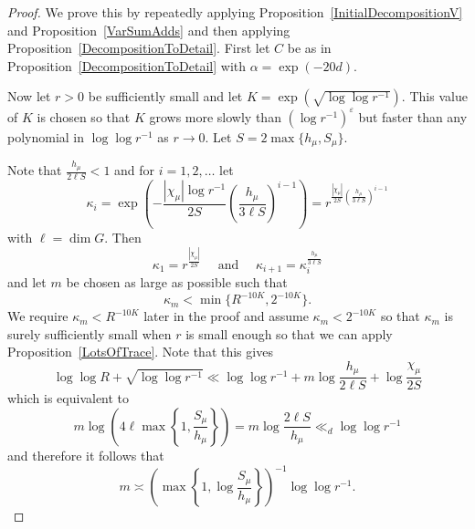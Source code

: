 \documentclass[10pt, english,oneside,reqno]{amsart}
\theoremstyle{plain}
\theoremstyle{remark}
\numberwithin{equation}{section}
\numberwithin{figure}{section}
\begin{document}
\begin{proof}
    We prove this by repeatedly applying Proposition~\ref{InitialDecompositionV} and Proposition~\ref{VarSumAdds} and then applying Proposition~\ref{DecompositionToDetail}. First let $C$ be as in Proposition~\ref{DecompositionToDetail} with $\alpha = \exp(-20 d)$.

    Now let $r > 0$ be sufficiently small and let $K = \exp(\sqrt{\log \log r^{-1}})$. This value of $K$ is chosen so that $K$ grows more slowly than $(\log r^{-1})^{\varepsilon}$ but faster than any polynomial in $\log \log r^{-1}$ as $r \to 0$. Let $S = 2\max \{h_{\mu}, S_{\mu} \}$.
    
    Note that $\frac{h_{\mu}}{2\ell S} < 1$ and for $i = 1, 2, \dots$ let $$\kappa_i = \exp \left( - \frac{|\chi_{\mu}| \log r^{-1}}{2 S} \left(\frac{h_{\mu}}{3 \ell S} \right)^{i-1} \right) = r^{\frac{|\chi_{\mu}|}{2 S}(\frac{h_{\mu}}{3 \ell S})^{i-1}}$$ with $\ell = \dim G$. Then $$\kappa_1 = r^{\frac{|\chi_{\mu}|}{2 S}} \quad \text{ and } \quad \kappa_{i+1} = \kappa_i^{\frac{h_{\mu}}{3 \ell S}}$$ and let $m$ be chosen as large as possible such that $$\kappa_m < \min \{R^{-10K}, 2^{-10K} \}.$$ We require $\kappa_m < R^{-10K}$ later in the proof and assume $\kappa_m < 2^{-10K}$ so that $\kappa_m$ is surely sufficiently small when $r$ is small enough so that we can apply Proposition~\ref{LotsOfTrace}. Note that this gives 
    $$\log \log R +  \sqrt{\log \log r^{-1}} \ll \log \log r^{-1} + m\log \frac{h_{\mu}}{2\ell S}  + \log \frac{\chi_{\mu}}{2S} $$ which is equivalent to $$m \log \left( 4\ell \max\left\{1, \frac{S_{\mu}}{h_{\mu}}\right\} \right)= m\log \frac{2\ell S}{h_{\mu}} \ll_d \log \log r^{-1}$$ and therefore it follows that $$m \asymp \left( \max \left\{ 1, \log \frac{S_{\mu}}{h_{\mu}} \right\} \right)^{-1} \log \log r^{-1} . $$ 


\end{proof}
\end{document}
